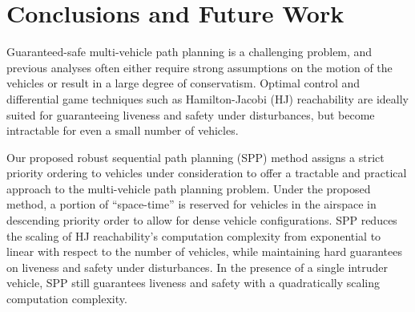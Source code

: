 \section{Conclusions and Future Work}
Guaranteed-safe multi-vehicle path planning is a challenging problem, and previous analyses often either require strong assumptions on the motion of the vehicles or result in a large degree of conservatism. Optimal control and differential game techniques such as Hamilton-Jacobi (HJ) reachability are ideally suited for guaranteeing liveness and safety under disturbances, but become intractable for even a small number of vehicles.

Our proposed robust sequential path planning (SPP) method assigns a strict priority ordering to vehicles under consideration to offer a tractable and practical approach to the multi-vehicle path planning problem. Under the proposed method, a portion of ``space-time'' is reserved for vehicles in the airspace in descending priority order to allow for dense vehicle configurations. SPP reduces the scaling of HJ reachability's computation complexity from exponential to linear with respect to the number of vehicles, while maintaining hard guarantees on liveness and safety under disturbances. In the presence of a single intruder vehicle, SPP still guarantees liveness and safety with a quadratically scaling computation complexity.